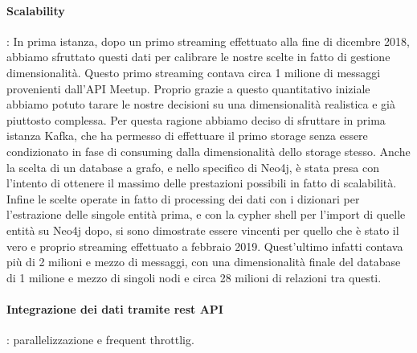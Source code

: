 \documentclass[fleqn,10pt]{SelfArx} %
\begin{document}
{\paragraph{Scalability}: In prima istanza, dopo un primo streaming effettuato alla fine di dicembre 2018, abbiamo sfruttato questi dati per calibrare le nostre scelte in fatto di gestione dimensionalità. Questo primo streaming contava circa 1 milione di messaggi provenienti dall'API Meetup. Proprio grazie a questo quantitativo iniziale abbiamo potuto tarare le nostre decisioni su una dimensionalità realistica e già piuttosto complessa. Per questa ragione abbiamo deciso di sfruttare in prima istanza Kafka, che ha permesso di effettuare il primo storage senza essere condizionato in fase di consuming dalla dimensionalità dello storage stesso. Anche la scelta di un database a grafo, e nello specifico di Neo4j, è stata presa con l'intento di ottenere il massimo delle prestazioni possibili in fatto di scalabilità. Infine le scelte operate in fatto di processing dei dati con i dizionari per l'estrazione delle singole entità prima, e con la cypher shell per l'import di quelle entità su Neo4j dopo, si sono dimostrate essere vincenti per quello che è stato il vero e proprio streaming effettuato a febbraio 2019. Quest'ultimo infatti contava più di 2 milioni e mezzo di messaggi, con una dimensionalità finale del database di 1 milione e mezzo di singoli nodi e circa 28 milioni di relazioni tra questi.
\paragraph{Integrazione dei dati tramite rest API}: parallelizzazione e frequent throttlig. %
}
\end{document}

